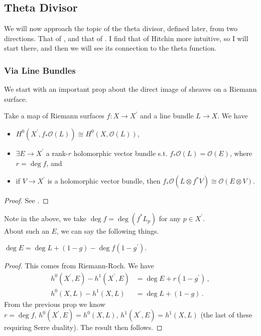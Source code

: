 \documentclass{article}
\begin{document}
\subsection{Theta Divisor}
We will now approach the topic of the theta divisor, defined later, from two directions. That of \cite{Hitchin1999}, and that of \cite{Farkas1992}. I find that of Hitchin more intuitive, so I will start there, and then we will see its connection to the theta function.  
\subsubsection{Via Line Bundles}
We start with an important prop about the direct image of sheaves on a Riemann surface.
\begin{prop}
	Take a map of Riemann surfaces $f:X \to X^\prime$ and a line bundle $L \to X$. We have
	\begin{itemize}
		\item $H^0(X^\prime,f_\ast \mathcal{O}(L)) \cong H^0(X,\mathcal{O}(L))$,
		\item $\exists E\to X^\prime$ a rank-$r$ holomorphic vector bundle s.t. $f_\ast \mathcal{O}(L) = \mathcal{O}(E)$, where $r=\deg f$, and 
		\item if $V\to X^\prime$ is a holomorphic vector bundle, then $f_\ast \mathcal{O}(L \otimes f^\ast V) \cong \mathcal{O}(E \otimes V)$.
	\end{itemize}
\end{prop}
\begin{proof}
	See \cite{Hitchin1999,Gunning1967}. 
\end{proof}
Note in the above, we take $\deg f = \deg (f^\ast L_p)$ for any $p \in X^\prime$. \\
About such an $E$, we can say the following things.
\begin{prop}
	$\deg E = \deg L + (1-g) - \deg f (1-g^\prime)$.
\end{prop}
\begin{proof}
	This comes from Riemann-Roch. We have 
	\begin{align*}
	h^0(X^\prime,E) - h^1(X^\prime,E) &= \deg E + r(1-g^\prime) \, , \\
	h^0(X,L) - h^1(X,L) &= \deg L + (1-g) \, .
\end{align*}
From the previous prop we know $r=\deg f, \, h^0(X^\prime,E) = h^0(X,L), \,  h^1(X^\prime,E) = h^1(X,L)$ (the last of these requiring Serre duality). The result then follows. 
\end{proof}
\end{document}
